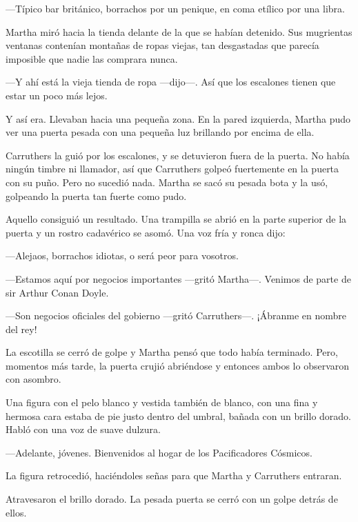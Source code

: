 ---Típico bar británico, borrachos por un penique, en coma etílico por
una libra.

Martha miró hacia la tienda delante de la que se habían detenido. Sus
mugrientas ventanas contenían montañas de ropas viejas, tan desgastadas
que parecía imposible que nadie las comprara nunca.

---Y ahí está la vieja tienda de ropa ---dijo---. Así que los escalones
tienen que estar un poco más lejos.

Y así era. Llevaban hacia una pequeña zona. En la pared izquierda,
Martha pudo ver una puerta pesada con una pequeña luz brillando por
encima de ella.

Carruthers la guió por los escalones, y se detuvieron fuera de la
puerta. No había ningún timbre ni llamador, así que Carruthers golpeó
fuertemente en la puerta con su puño. Pero no sucedió nada. Martha se
sacó su pesada bota y la usó, golpeando la puerta tan fuerte como pudo.

Aquello consiguió un resultado. Una trampilla se abrió en la parte
superior de la puerta y un rostro cadavérico se asomó. Una voz fría y
ronca dijo:

---Alejaos, borrachos idiotas, o será peor para vosotros.

---Estamos aquí por negocios importantes ---gritó Martha---. Venimos de
parte de sir Arthur Conan Doyle.

---Son negocios oficiales del gobierno ---gritó Carruthers---. ¡Ábranme
en nombre del rey!

La escotilla se cerró de golpe y Martha pensó que todo había terminado.
Pero, momentos más tarde, la puerta crujió abriéndose y entonces ambos
lo observaron con asombro.

Una figura con el pelo blanco y vestida también de blanco, con una fina
y hermosa cara estaba de pie justo dentro del umbral, bañada con un
brillo dorado. Habló con una voz de suave dulzura.

---Adelante, jóvenes. Bienvenidos al hogar de los Pacificadores
Cósmicos.

La figura retrocedió, haciéndoles señas para que Martha y Carruthers
entraran.

Atravesaron el brillo dorado. La pesada puerta se cerró con un golpe
detrás de ellos.
